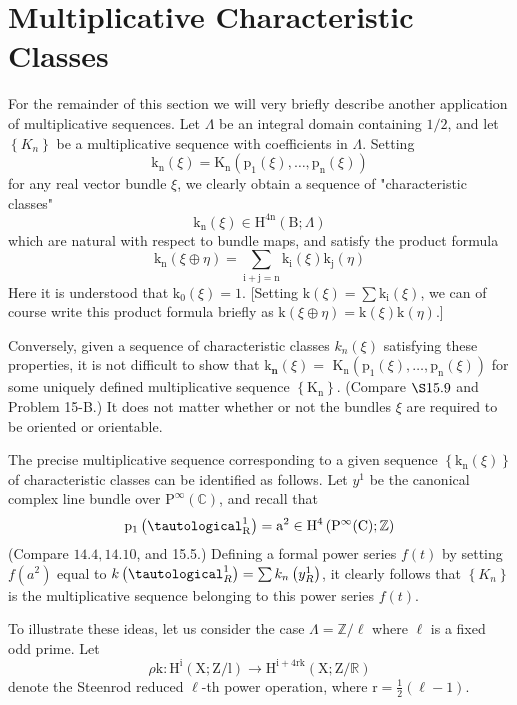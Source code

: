 \documentclass[10pt]{article}
\begin{document}
\section{Multiplicative Characteristic Classes}
For the remainder of this section we will very briefly describe another application of multiplicative sequences. Let $\Lambda$ be an integral domain containing $1 / 2$, and let $\left\{K_{n}\right\}$ be a multiplicative sequence with coefficients in $\Lambda$. Setting
$$
\mathrm{k}_{\mathrm{n}}(\xi)=\mathrm{K}_{\mathrm{n}}\left(\mathrm{p}_{1}(\xi), \ldots, \mathrm{p}_{\mathrm{n}}(\xi)\right)
$$
for any real vector bundle $\xi$, we clearly obtain a sequence of "characteristic classes"
$$
\mathrm{k}_{\mathrm{n}}(\xi) \in \mathrm{H}^{4 \mathrm{n}}(\mathrm{B} ; \Lambda)
$$
which are natural with respect to bundle maps, and satisfy the product formula
$$
\mathrm{k}_{\mathrm{n}}(\xi \oplus \eta)=\sum_{\mathrm{i}+\mathrm{j}=\mathrm{n}} \mathrm{k}_{\mathrm{i}}(\xi) \mathrm{k}_{\mathrm{j}}(\eta)
$$
Here it is understood that $\mathrm{k}_{0}(\xi)=1$. [Setting $\mathrm{k}(\xi)=\sum \mathrm{k}_{\mathrm{i}}(\xi)$, we can of course write this product formula briefly as $\mathrm{k}(\xi \oplus \eta)=\mathrm{k}(\xi) \mathrm{k}(\eta)$.]

Conversely, given a sequence of characteristic classes $k_{n}(\xi)$ satisfying these properties, it is not difficult to show that $\mathrm{k}_{\mathbf{n}}(\xi)=$ $\mathrm{K}_{\mathrm{n}}\left(\mathrm{p}_{1}(\xi), \ldots, \mathrm{p}_{\mathrm{n}}(\xi)\right)$ for some uniquely defined multiplicative sequence $\left\{\mathrm{K}_{\mathrm{n}}\right\}$. (Compare $\S 15.9$ and Problem 15-B.) It does not matter whether or not the bundles $\xi$ are required to be oriented or orientable.

The precise multiplicative sequence corresponding to a given sequence $\left\{\mathrm{k}_{\mathrm{n}}(\xi)\right\}$ of characteristic classes can be identified as follows. Let $y^{1}$ be the canonical complex line bundle over $\mathrm{P}^{\infty}(\mathbb{C})$, and recall that
$$
\mathrm{p}_{1}\left(\tautological_{\mathrm{R}}^{1}\right)=\mathrm{a}^{2} \in \mathrm{H}^{4}\left(\mathrm{P}^{\infty}(\mathrm{C}) ; \mathbb{Z}\right)
$$
(Compare $14.4,14.10$, and 15.5.) Defining a formal power series $f(t)$ by setting $f\left(a^{2}\right)$ equal to $k\left(\tautological_{R}^{1}\right)=\sum k_{n}\left(y_{R}^{1}\right)$, it clearly follows that $\left\{K_{n}\right\}$ is the multiplicative sequence belonging to this power series $f(t)$.

To illustrate these ideas, let us consider the case $\Lambda=\mathbb{Z} / \ell$ where $\ell$ is a fixed odd prime. Let
$$
\rho \mathrm{k}: \mathrm{H}^{\mathrm{i}}(\mathrm{X} ; \mathrm{Z} / \mathrm{l}) \rightarrow \mathrm{H}^{\mathrm{i}+4 \mathrm{rk}}(\mathrm{X} ; \mathrm{Z} / \mathbb{R})
$$
denote the Steenrod reduced $\ell$-th power operation, where $\mathrm{r}=\frac{1}{2}(\ell-1)$.
\end{document}
